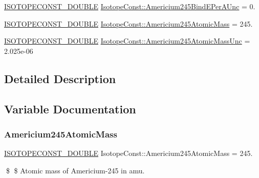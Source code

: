 \begin{DoxyCompactItemize}
\mbox{\hyperlink{group___isotope_const-_macros_ga8f45a7272ce02c0b4c65c44636ed719a}{I\+S\+O\+T\+O\+P\+E\+C\+O\+N\+S\+T\+\_\+\+D\+O\+U\+B\+LE}} \mbox{\hyperlink{group___isotope_const-_americium-_am245_ga947c09432248c1d8080d6b3d6d77206d}{Isotope\+Const\+::\+Americium245\+Bind\+E\+Per\+A\+Unc}} = 0.
\item 
\mbox{\hyperlink{group___isotope_const-_macros_ga8f45a7272ce02c0b4c65c44636ed719a}{I\+S\+O\+T\+O\+P\+E\+C\+O\+N\+S\+T\+\_\+\+D\+O\+U\+B\+LE}} \mbox{\hyperlink{group___isotope_const-_americium-_am245_gad2ac86edefe162545bce9d94d48befe2}{Isotope\+Const\+::\+Americium245\+Atomic\+Mass}} = 245.
\item 
\mbox{\hyperlink{group___isotope_const-_macros_ga8f45a7272ce02c0b4c65c44636ed719a}{I\+S\+O\+T\+O\+P\+E\+C\+O\+N\+S\+T\+\_\+\+D\+O\+U\+B\+LE}} \mbox{\hyperlink{group___isotope_const-_americium-_am245_ga1835a3432c5141ad71dea1d1d46d5907}{Isotope\+Const\+::\+Americium245\+Atomic\+Mass\+Unc}} = 2.\+025e-\/06
\end{DoxyCompactItemize}


\subsection{Detailed Description}


\subsection{Variable Documentation}
\mbox{\label{group___isotope_const-_americium-_am245_gad2ac86edefe162545bce9d94d48befe2}} 
\subsubsection{\texorpdfstring{Americium245\+Atomic\+Mass}{Americium245AtomicMass}}
{\footnotesize\ttfamily \mbox{\hyperlink{group___isotope_const-_macros_ga8f45a7272ce02c0b4c65c44636ed719a}{I\+S\+O\+T\+O\+P\+E\+C\+O\+N\+S\+T\+\_\+\+D\+O\+U\+B\+LE}} Isotope\+Const\+::\+Americium245\+Atomic\+Mass = 245.}

\$ \$ Atomic mass of Americium-\/245 in amu. \mbox{\label{group___isotope_const-_americium-_am245_ga1835a3432c5141ad71dea1d1d46d5907}} 
